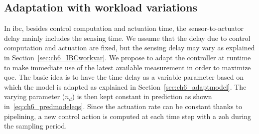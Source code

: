 \subsection{Adaptation with workload variations}
\label{sec:ch6_cases}
In \gls{ibc}, besides control computation and actuation time, the sensor-to-actuator delay mainly includes the sensing time. We assume that the delay due to control computation and actuation are fixed, but the sensing delay may vary as explained in Section~\ref{sec:ch6_IBCworkvar}. 
We propose to adapt the controller at runtime to make immediate use of the latest available measurement in order to maximize \gls{qoc}. The basic idea is to have the time delay as a variable parameter based on which the model is adapted as explained in Section~\ref{sec:ch6_adaptmodel}. The varying parameter ($n_d$) is then kept constant in prediction as shown in~\eqref{eq:ch6_predmodeleqs}. Since the actuation rate can be constant thanks to pipelining, a new control action is computed at each time step with a \gls{zoh} during the sampling period. 

